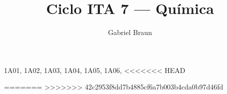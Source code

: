 \documentclass[braun]{braun}
\title{Ciclo ITA 7 --- Química}
\affiliation{Colégio e Curso Pensi, Turma IME-ITA}
\author{Gabriel Braun}
\begin{document}
\maketitle[botrule=true]

\makedata[front-data=true,math/math={ ln(2)/ln(10), ln(3)/ln(10) }, elements/style=ptable]

%                                              
%                                              

\InputDB
{
    1A01, 
    1A02,
    1A03,
    1A04,
    1A05,
    1A06,
<<<<<<< HEAD

=======
>>>>>>> 42c2953f8dd7b4885cf6a7b003b4cda0b97d46fd
}

\makegaba

%                                              
%                                              
\end{document}
